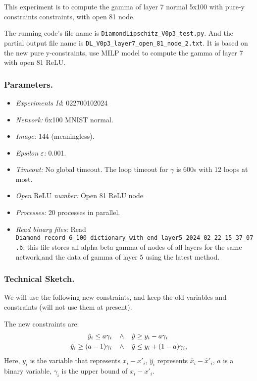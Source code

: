 \documentclass{llncs}
\newcommand{\ReLU}{\mathrm{ReLU}}
\begin{document}
This experiment is to compute the gamma of layer 7 normal 5x100 with pure-y constraints constraints, with open 81 node.

\vspace*{1ex}

The running code's file name is \verb*|DiamondLipschitz_V0p3_test.py|. And the partial output file name is \verb*|DL_V0p3_layer7_open_81_node_2.txt|.  It is based on the new pure y-constraints, use MILP model to compute the gamma of layer 7 with open 81 ReLU.

\subsubsection*{Parameters.}

\begin{itemize}
	\item\emph{Experiments Id}: 022700102024
	
	\item\emph{Network:} 6x100 MNIST normal. 
	
	\item\emph{Image:} 144 (meaningless).
	
	\item\emph{Epsilon $\varepsilon$:} 0.001.
	
	\item\emph{Timeout:} No global timeout. The loop timeout for $\gamma$ is 600s with 12 loops at most.
	
	\item\emph{Open $\ReLU$ number:} Open 81 ReLU node
	
	\item\emph{Processes:} 20 processes in parallel. 
	
	\item\emph{Read binary files:} Read \verb*|Diamond_record_6_100_dictionary_with_end_layer5_2024_02_22_15_37_07.b|; this file stores all alpha beta gamma of nodes of all layers for the same network,and the data of gamma of layer 5 using the latest method. 
\end{itemize}


\subsubsection*{Technical Sketch.}

We will use the following new constraints, and keep the old variables and constraints (will not use them at present).

The new constraints are: \begin{align*}
	\hat{y}_i \leq a \gamma_i \hspace*{2ex} &\wedge \hspace*{2ex}\hat{y} \geq y_i - a \gamma_i\\
	\hat{y}_i \geq (a-1) \gamma_i  \hspace*{2ex} &\wedge \hspace*{2ex} \hat{y} \leq y_i + (1-a) \gamma_i,
\end{align*} Here, $y_i$ is the variable that represents $x_i-x'_i$, $\hat{y}_i$ represents $\hat{x}_i-\hat{x}'_i$, $a$ is a binary variable, $\gamma_i$ is the upper bound of $x_i-x'_i$.
\end{document}
